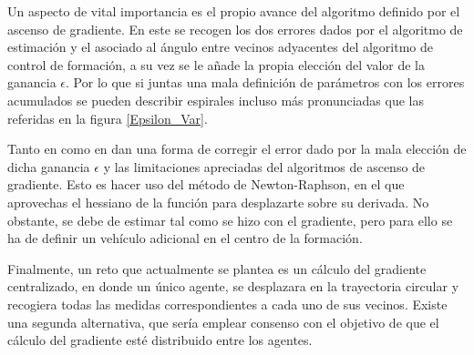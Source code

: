 Un aspecto de vital importancia es el propio avance del algoritmo definido por el ascenso de gradiente. En este se recogen los dos errores dados por el algoritmo de estimación y el asociado al ángulo entre vecinos adyacentes del algoritmo de control de formación, a su vez se le añade la propia elección del valor de la ganancia $\epsilon$. Por lo que si juntas una mala definición de parámetros con los errores acumulados se pueden describir espirales incluso más pronunciadas que las referidas en la figura \ref{Epsilon_Var}.

Tanto en \cite{Estimacion_Gradiente} como en \cite{Adicional_Estimacion_1} dan una forma de corregir el error dado por la mala elección de dicha ganancia $\epsilon$ y las limitaciones apreciadas del algoritmos de ascenso de gradiente. Esto es hacer uso del método de Newton-Raphson, en el que aprovechas el hessiano de la función para desplazarte sobre su derivada. No obstante, se debe de estimar tal como se hizo con el gradiente, pero para ello se ha de definir un vehículo adicional en el centro de la formación.

Finalmente, un reto que actualmente se plantea es un cálculo del gradiente centralizado, en donde un único agente, se desplazara en la trayectoria circular y recogiera todas las medidas correspondientes a cada uno de sus vecinos. Existe una segunda alternativa, que sería emplear consenso con el objetivo de que el cálculo del gradiente esté distribuido entre los agentes.

\nocite{Git__todos}